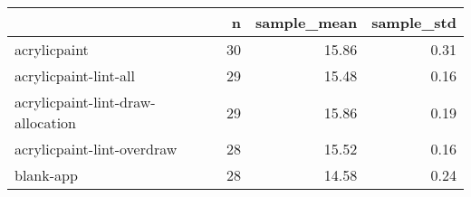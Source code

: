 \begin{tabular}{lrrr}
\toprule
{} &   n &  sample\_mean &  sample\_std \\
\midrule
acrylicpaint                      &  30 &        15.86 &        0.31 \\
acrylicpaint-lint-all             &  29 &        15.48 &        0.16 \\
acrylicpaint-lint-draw-allocation &  29 &        15.86 &        0.19 \\
acrylicpaint-lint-overdraw        &  28 &        15.52 &        0.16 \\
blank-app                         &  28 &        14.58 &        0.24 \\
\bottomrule
\end{tabular}
